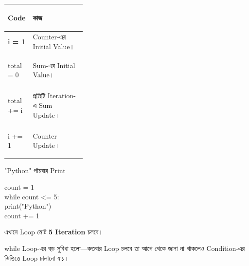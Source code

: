 \begin{tabularx}
{\linewidth}
{
|>{\bfseries\RaggedRight\arraybackslash}p{0.32\linewidth}
|Y|
}

\hline
{}

\textbf{Code}
&
\textbf{কাজ}
\\
\hline

\textenglish{\ttfamily i = 1}
&
Counter-এর Initial Value।
\\
\hline

\textenglish{\ttfamily total = 0}
&
Sum-এর Initial Value।
\\
\hline

\textenglish{\ttfamily total += i}
&
প্রতিটি Iteration-এ Sum Update।
\\
\hline

\textenglish{\ttfamily i += 1}
&
Counter Update।
\\
\hline

\end{tabularx}



\begin{examplebox}{\textenglish{\ttfamily "Python"} পাঁচবার Print}

\begin{codebox}
\begin{english}
\ttfamily
count = 1\\[0.5mm]
while count <= 5:\\
\hspace*{4mm}print("Python")\\
\hspace*{4mm}count += 1
\end{english}
\end{codebox}

এখানে Loop মোট \textbf{5 Iteration} চলবে।

\end{examplebox}



\textenglish{\ttfamily while}
Loop-এর বড় সুবিধা হলো—কতবার Loop চলবে তা আগে থেকে জানা না থাকলেও
Condition-এর ভিত্তিতে Loop চালানো যায়।

